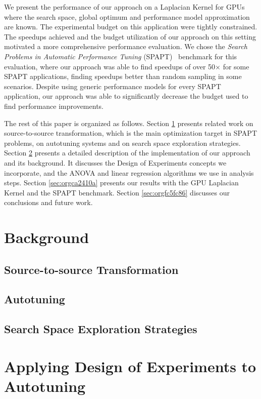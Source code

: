 \documentclass[conference]{IEEEtran}
\begin{document}
We present the performance of our approach on a Laplacian Kernel for GPUs where
the search space, global optimum and performance model approximation are known.
The experimental budget on this application were tightly constrained. The
speedups achieved and the budget utilization of our approach on this setting
motivated a more comprehensive performance evaluation. We chose the \emph{Search
Problems in Automatic Performance Tuning}
(SPAPT)~\cite{balaprakash2012spapt} benchmark for this evaluation, where
our approach was able to find speedups of over 50\(\times\) for some SPAPT
applications, finding speedups better than random sampling in some scenarios.
Despite using generic performance models for every SPAPT application, our
approach was able to significantly decrease the budget used to find performance
improvements.

The rest of this paper is organized as follows. Section \ref{sec:orgf0c6171} presents
related work on source-to-source transformation, which is the main optimization
target in SPAPT problems, on autotuning systems and on search space exploration
strategies. Section \ref{sec:orgfd705fb} presents a
detailed description of the implementation of our approach and its background.
It discusses the Design of Experiments concepts we incorporate, and the ANOVA
and linear regression algorithms we use in analysis steps. Section \ref{sec:orgca2410a} presents our results with the GPU Laplacian Kernel and the SPAPT
benchmark. Section \ref{sec:orgfc5fc86} discusses our conclusions and future work.

\section{Background}
\label{sec:orgf0c6171}
\subsection{Source-to-source Transformation}
\label{sec:orgb5293c6}
\subsection{Autotuning}
\label{sec:org4a974da}
\subsection{Search Space Exploration Strategies}
\label{sec:org576182a}
\section{Applying Design of Experiments to Autotuning}
\label{sec:orgfd705fb}
\end{document}
